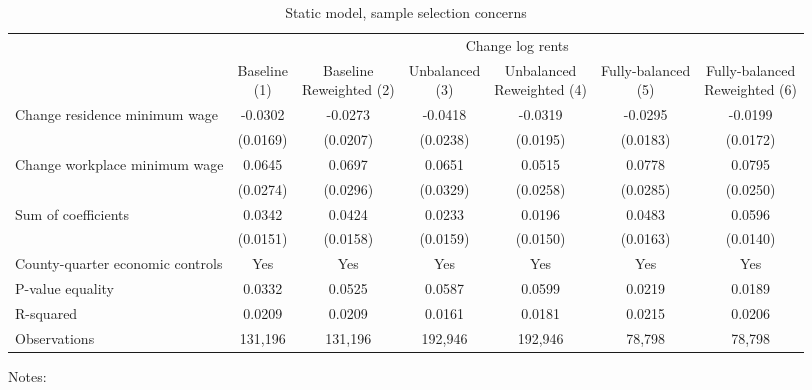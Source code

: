 \begin{table}
    \caption{Static model, sample selection concerns}
    \label{tab:static_sample}

    \begin{tabular}{@{}lcccccc@{}}
        \toprule
                                             & \multicolumn{6}{c}{Change log rents}                                     \\ \cmidrule(l){2-7} 
                                             & \shortstack{Baseline\\(1)}       & \shortstack{Baseline\\Reweighted (2)}
                                             & \shortstack{Unbalanced\\(3)}     & \shortstack{Unbalanced\\Reweighted (4)}
                                             & \shortstack{Fully-balanced\\(5)} & \shortstack{Fully-balanced\\Reweighted (6)}  \\ \midrule
        Change residence minimum wage        & -0.0302      & -0.0273        & -0.0418       & -0.0319      & -0.0295     & -0.0199            \\
                                             & (0.0169)    & (0.0207)      & (0.0238)     & (0.0195)    & (0.0183)   & (0.0172)          \\
        Change workplace minimum wage        & 0.0645      & 0.0697        & 0.0651       & 0.0515      & 0.0778     & 0.0795            \\
                                             & (0.0274)    & (0.0296)      & (0.0329)     & (0.0258)    & (0.0285)   & (0.0250)          \\ \midrule
        Sum of coefficients                  & 0.0342      & 0.0424        & 0.0233       & 0.0196      & 0.0483     &  0.0596           \\
                                             & (0.0151)    & (0.0158)      & (0.0159)     & (0.0150)    & (0.0163)   & (0.0140)          \\ \midrule
        County-quarter economic controls          & Yes      & Yes        & Yes       & Yes      & Yes     & Yes            \\
        P-value equality                     & 0.0332      & 0.0525        & 0.0587       & 0.0599      & 0.0219     & 0.0189            \\
        R-squared                            & 0.0209      & 0.0209        & 0.0161       & 0.0181      & 0.0215     & 0.0206            \\
        Observations                         & 131,196     & 131,196       & 192,946      & 192,946     & 78,798    & 78,798           \\ \bottomrule
    \end{tabular}

    \begin{minipage}{.95\textwidth} \footnotesize
        \vspace{2mm}
        Notes: 
    \end{minipage}
\end{table}
